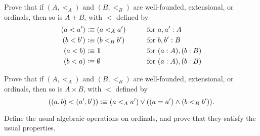 \begin{ex}
  Prove that if $(A,<_A)$ and $(B,<_B)$ are well-founded, extensional, or ordinals, then so is $A+B$, with $<$ defined by
  \begin{alignat*}{2}
    (a<a') &\vcentcolon\equiv (a<_A a') &\qquad\text{for }& a,a':A\\
    (b<b') &\vcentcolon\equiv (b<_B b') &\qquad\text{for }& b,b':B\\
    (a<b) &\vcentcolon\equiv \mathbf{1} &\qquad\text{for }& (a:A),(b:B)\\
    (b<a) &\vcentcolon\equiv \emptyset &\qquad\text{for } &(a:A),(b:B)
  \end{alignat*}
\end{ex}

\begin{ex}
  Prove that if $(A,<_A)$ and $(B,<_B)$ are well-founded, extensional, or ordinals, then so is $A\times B$, with $<$ defined by
  \[ ((a,b) <(a',b')) \vcentcolon\equiv (a<_A a') \vee ((a=a') \wedge (b<_B b')). \]
\end{ex}

\begin{ex}
  Define the usual algebraic operations on ordinals, and prove that they satisfy the usual properties.
\end{ex}

